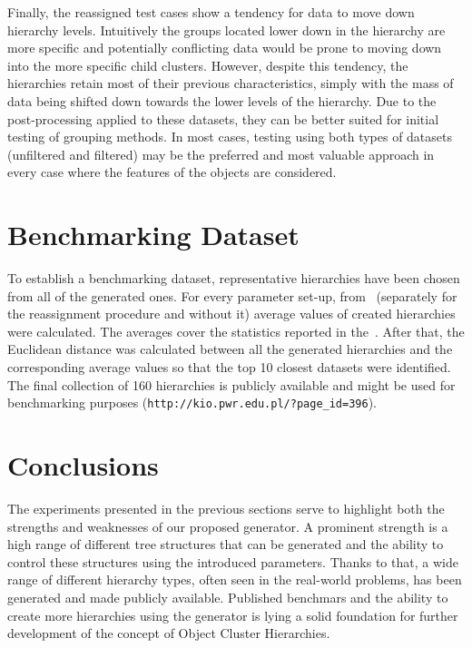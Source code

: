 \documentclass{article}
\begin{document}
    Finally, the reassigned test cases show a tendency for data to move down hierarchy levels. Intuitively the groups located lower down in the hierarchy are more specific and potentially conflicting data would be prone to moving down into the more specific child clusters. However, despite this tendency, the hierarchies retain most of their previous characteristics, simply with the mass of data being shifted down towards the lower levels of the hierarchy. Due to the post-processing applied to these datasets, they can be better suited for initial testing of grouping methods. In most cases, testing using both types of datasets (unfiltered and filtered) may be the preferred and most valuable approach in every case where the features of the objects are considered. 
    
	\section{Benchmarking Dataset}
    \label{sec:benchmarking_dataset}
    To establish a benchmarking dataset, representative hierarchies have been chosen from all of the generated ones. For every parameter set-up, from~ (separately for the reassignment procedure and without it) average values of created hierarchies were calculated. The averages cover the statistics reported in the~. After that, the Euclidean distance was calculated between all the generated hierarchies and the corresponding average values so that the top 10 closest datasets were identified. The final collection of 160 hierarchies is publicly available and might be used for benchmarking purposes (\texttt{http://kio.pwr.edu.pl/?page\_id=396}).
	\section{Conclusions}
	\label{conclusion}
	The experiments presented in the previous sections serve to highlight both the strengths and weaknesses of our proposed generator. A prominent strength is a high range of different tree structures that can be generated and the ability to control these structures using the introduced parameters. Thanks to that, a wide range of different hierarchy types, often seen in the real-world problems, has been generated and made publicly available. Published benchmars and the ability to create more hierarchies using the generator is lying a solid foundation for further development of the concept of Object Cluster Hierarchies.
	
\end{document}
